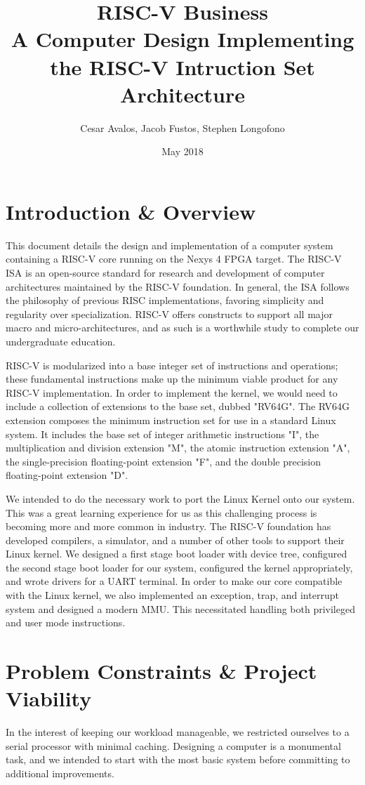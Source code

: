 \documentclass{article}
\title{RISC-V Business\\ \large A Computer Design Implementing the RISC-V Intruction Set Architecture}
\author{Cesar Avalos, Jacob Fustos, Stephen Longofono}
\date{May 2018}
\begin{document}
\maketitle

\tableofcontents
\listoffigures

\section{Introduction \& Overview}
This document details the design and implementation of a computer system containing a RISC-V core running on the Nexys 4 FPGA target.  The RISC-V ISA is an open-source standard for research and development of computer architectures maintained by the RISC-V foundation.  In general, the ISA follows the philosophy of previous RISC implementations, favoring simplicity and regularity over specialization.  RISC-V offers constructs to support all major macro and micro-architectures, and as such is a worthwhile study to complete our undergraduate education.

RISC-V is modularized into a base integer set of instructions and operations; these fundamental instructions make up the minimum viable product for any RISC-V implementation\cite{RISCV_RDR}.  In order to implement the kernel, we would need to include a collection of extensions to the base set, dubbed "RV64G".  The RV64G extension composes the minimum instruction set for use in a standard Linux system.  It includes the base set of integer arithmetic instructions "I", the multiplication and division extension "M", the atomic instruction extension "A", the single-precision floating-point extension "F", and the double precision floating-point extension "D".

We intended to do the necessary work to port the Linux Kernel onto our system. This was a great learning experience for us as this challenging process is becoming more and more common in industry. The RISC-V foundation has developed compilers, a simulator, and a number of other tools to support their Linux kernel\cite{RISCV_SS}.  We designed a first stage boot loader with device tree, configured the second stage boot loader for our system, configured the kernel appropriately, and wrote drivers for a UART terminal. In order to make our core compatible with the Linux kernel, we also implemented an exception, trap, and interrupt system and designed a modern MMU.  This necessitated handling both privileged and user mode instructions.

\section{Problem Constraints \& Project Viability}
In the interest of keeping our workload manageable, we restricted ourselves to a serial processor with minimal caching.  Designing a computer is a monumental task, and we intended to start with the most basic system before committing to additional improvements.
\end{document}
